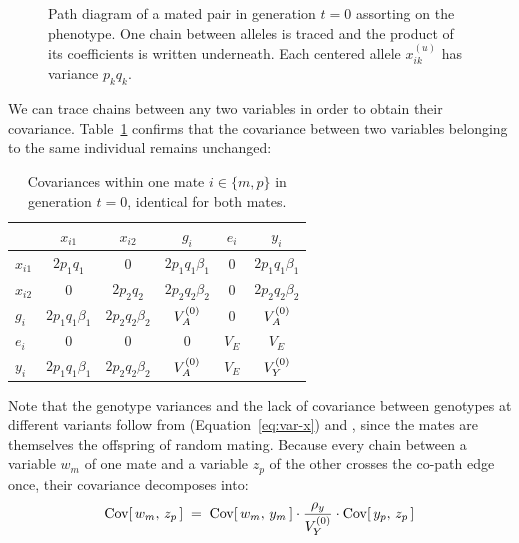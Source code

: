 \documentclass[12pt]{article}
\numberwithin{equation}{section}
\begin{document}
\begin{figure}[H]
    \begin{floatcard}
        
        \caption{%
            Path diagram of a mated pair in generation $t=0$ assorting on the phenotype.
            One chain between alleles is traced and the product of its coefficients is written underneath.
            Each centered allele $x^{(u)}_{ik}$ has variance $p_k q_k$.%
        }
        \label{fig:am-pair}
    \end{floatcard}
\end{figure}

We can trace chains between any two variables in order to obtain their covariance.
Table~\ref{tab:am-pair-within} confirms that the covariance between two variables belonging to the same individual remains unchanged:

\begin{table}[H]
    \begin{floatcard}
    \renewcommand{\arraystretch}{1.4}
    \begin{tabular}{l|ccccc}
                 & $x_{i1}$ & $x_{i2}$ & $g_i$ & $e_i$ & $y_i$ \\
        \hline
        $x_{i1}$ & $2p_1 q_1$ & $0$ & $2p_1 q_1\beta_1$ & $0$ & $2p_1 q_1\beta_1$ \\
        $x_{i2}$ & $0$ & $2p_2 q_2$ & $2p_2 q_2\beta_2$ & $0$ & $2p_2 q_2\beta_2$ \\
        $g_i$    & $2p_1 q_1\beta_1$ & $2p_2 q_2\beta_2$ & $V_A^{(0)}$ & $0$ & $V_A^{(0)}$ \\
        $e_i$    & $0$ & $0$ & $0$ & $V_E$ & $V_E$ \\
        $y_i$    & $2p_1 q_1\beta_1$ & $2p_2 q_2\beta_2$ & $V_A^{(0)}$ & $V_E$ & $V_Y^{(0)}$ \\
    \end{tabular}
    \caption{%
        Covariances within one mate $i \in \{m,p\}$ in generation $t=0$, identical for both mates.%
    }
    \label{tab:am-pair-within}
    \end{floatcard}
\end{table}

Note that the genotype variances and the lack of covariance between genotypes at different variants follow from  (Equation~\eqref{eq:var-x}) and , since the mates are themselves the offspring of random mating.
Because every chain between a variable $w_m$ of one mate and a variable $z_p$ of the other crosses the co-path edge once, their covariance decomposes into:
\begin{equation}\label{eq:leg-rule}
    \mathrm{Cov}[\,w_m,\, z_p\,] \;=\; \mathrm{Cov}[\,w_m,\, y_m\,] \cdot \frac{\rho_y}{V_Y^{(0)}} \cdot \mathrm{Cov}[\,y_p,\, z_p\,]
\end{equation}
\end{document}
